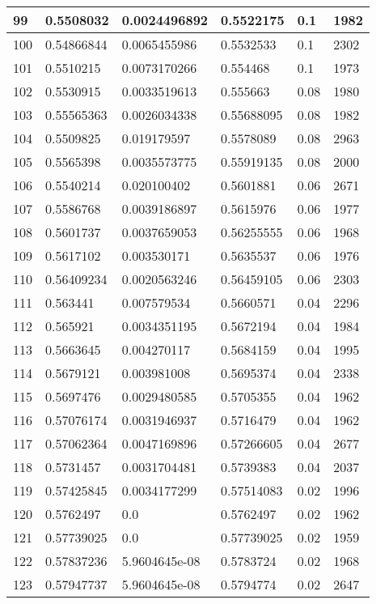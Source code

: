 \begin{longtable}{|l|l|l|l|l|l|}
99 & 0.5508032 & 0.0024496892 & 0.5522175 & 0.1 & 1982 \\ \hline 
100 & 0.54866844 & 0.0065455986 & 0.5532533 & 0.1 & 2302 \\ \hline 
101 & 0.5510215 & 0.0073170266 & 0.554468 & 0.1 & 1973 \\ \hline 
102 & 0.5530915 & 0.0033519613 & 0.555663 & 0.08 & 1980 \\ \hline 
103 & 0.55565363 & 0.0026034338 & 0.55688095 & 0.08 & 1982 \\ \hline 
104 & 0.5509825 & 0.019179597 & 0.5578089 & 0.08 & 2963 \\ \hline 
105 & 0.5565398 & 0.0035573775 & 0.55919135 & 0.08 & 2000 \\ \hline 
106 & 0.5540214 & 0.020100402 & 0.5601881 & 0.06 & 2671 \\ \hline 
107 & 0.5586768 & 0.0039186897 & 0.5615976 & 0.06 & 1977 \\ \hline 
108 & 0.5601737 & 0.0037659053 & 0.56255555 & 0.06 & 1968 \\ \hline 
109 & 0.5617102 & 0.003530171 & 0.5635537 & 0.06 & 1976 \\ \hline 
110 & 0.56409234 & 0.0020563246 & 0.56459105 & 0.06 & 2303 \\ \hline 
111 & 0.563441 & 0.007579534 & 0.5660571 & 0.04 & 2296 \\ \hline 
112 & 0.565921 & 0.0034351195 & 0.5672194 & 0.04 & 1984 \\ \hline 
113 & 0.5663645 & 0.004270117 & 0.5684159 & 0.04 & 1995 \\ \hline 
114 & 0.5679121 & 0.003981008 & 0.5695374 & 0.04 & 2338 \\ \hline 
115 & 0.5697476 & 0.0029480585 & 0.5705355 & 0.04 & 1962 \\ \hline 
116 & 0.57076174 & 0.0031946937 & 0.5716479 & 0.04 & 1962 \\ \hline 
117 & 0.57062364 & 0.0047169896 & 0.57266605 & 0.04 & 2677 \\ \hline 
118 & 0.5731457 & 0.0031704481 & 0.5739383 & 0.04 & 2037 \\ \hline 
119 & 0.57425845 & 0.0034177299 & 0.57514083 & 0.02 & 1996 \\ \hline 
120 & 0.5762497 & 0.0 & 0.5762497 & 0.02 & 1962 \\ \hline 
121 & 0.57739025 & 0.0 & 0.57739025 & 0.02 & 1959 \\ \hline 
122 & 0.57837236 & 5.9604645e-08 & 0.5783724 & 0.02 & 1968 \\ \hline 
123 & 0.57947737 & 5.9604645e-08 & 0.5794774 & 0.02 & 2647 \\ \hline 

\end{longtable}
